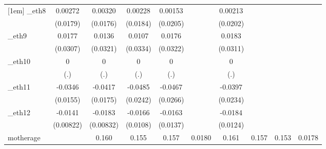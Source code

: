 \begin{table}[htbp]
\begin{tabular}{l*{9}{c}}
[1em]
\_eth8       &     0.00272         &     0.00320         &     0.00228         &     0.00153         &                     &     0.00213         &                     &                     &                     \\
            &    (0.0179)         &    (0.0176)         &    (0.0184)         &    (0.0205)         &                     &    (0.0202)         &                     &                     &                     \\
[1em]
\_eth9       &      0.0177         &      0.0136         &      0.0107         &      0.0176         &                     &      0.0183         &                     &                     &                     \\
            &    (0.0307)         &    (0.0321)         &    (0.0334)         &    (0.0322)         &                     &    (0.0311)         &                     &                     &                     \\
[1em]
\_eth10      &           0         &           0         &           0         &           0         &                     &           0         &                     &                     &                     \\
            &         (.)         &         (.)         &         (.)         &         (.)         &                     &         (.)         &                     &                     &                     \\
[1em]
\_eth11      &     -0.0346\sym{**} &     -0.0417\sym{**} &     -0.0485\sym{**} &     -0.0467\sym{*}  &                     &     -0.0397\sym{*}  &                     &                     &                     \\
            &    (0.0155)         &    (0.0175)         &    (0.0242)         &    (0.0266)         &                     &    (0.0234)         &                     &                     &                     \\
[1em]
\_eth12      &     -0.0141\sym{*}  &     -0.0183\sym{**} &     -0.0166         &     -0.0163         &                     &     -0.0184         &                     &                     &                     \\
            &   (0.00822)         &   (0.00832)         &    (0.0108)         &    (0.0137)         &                     &    (0.0124)         &                     &                     &                     \\
[1em]
motherage   &                     &       0.160         &       0.155         &       0.157         &      0.0180         &       0.161         &       0.157         &       0.153         &      0.0178         \\

\end{tabular}
\end{table}
